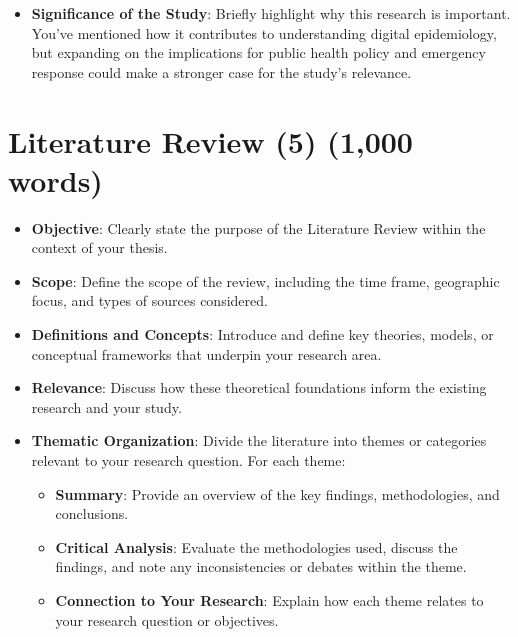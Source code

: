 \documentclass[
  12pt,
]{article}
\providecommand{\tightlist}{%
  \setlength{\itemsep}{0pt}\setlength{\parskip}{0pt}}\usepackage{longtable,booktabs,array}
\begin{document}
\begin{itemize}
\tightlist
\item
  \textbf{Significance of the Study}: Briefly highlight why this
  research is important. You've mentioned how it contributes to
  understanding digital epidemiology, but expanding on the implications
  for public health policy and emergency response could make a stronger
  case for the study's relevance.
\end{itemize}

\section{Literature Review (5) (1,000
words)}\label{literature-review-5-1000-words}

\begin{itemize}
\item
  \textbf{Objective}: Clearly state the purpose of the Literature Review
  within the context of your thesis.
\item
  \textbf{Scope}: Define the scope of the review, including the time
  frame, geographic focus, and types of sources considered.
\item
  \textbf{Definitions and Concepts}: Introduce and define key theories,
  models, or conceptual frameworks that underpin your research area.
\item
  \textbf{Relevance}: Discuss how these theoretical foundations inform
  the existing research and your study.
\item
  \textbf{Thematic Organization}: Divide the literature into themes or
  categories relevant to your research question. For each theme:

  \begin{itemize}
  \item
    \textbf{Summary}: Provide an overview of the key findings,
    methodologies, and conclusions.
  \item
    \textbf{Critical Analysis}: Evaluate the methodologies used, discuss
    the findings, and note any inconsistencies or debates within the
    theme.
  \item
    \textbf{Connection to Your Research}: Explain how each theme relates
    to your research question or objectives.
  \end{itemize}
\end{itemize}
\end{document}
